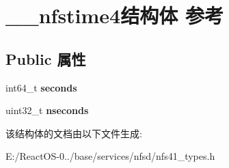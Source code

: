 \hypertarget{struct____nfstime4}{}\section{\+\_\+\+\_\+nfstime4结构体 参考}
\label{struct____nfstime4}
\subsection*{Public 属性}
\begin{DoxyCompactItemize}
\item 
\mbox{\label{struct____nfstime4_a4a3e0e7388735857b1f504b2df0710a0}} 
int64\+\_\+t {\bfseries seconds}
\item 
\mbox{\label{struct____nfstime4_a69cd3d8c64927e4e24f93eb6cbf52169}} 
uint32\+\_\+t {\bfseries nseconds}
\end{DoxyCompactItemize}


该结构体的文档由以下文件生成\+:\begin{DoxyCompactItemize}
\item 
E\+:/\+React\+O\+S-\/0../base/services/nfsd/nfs41\+\_\+types.\+h\end{DoxyCompactItemize}

